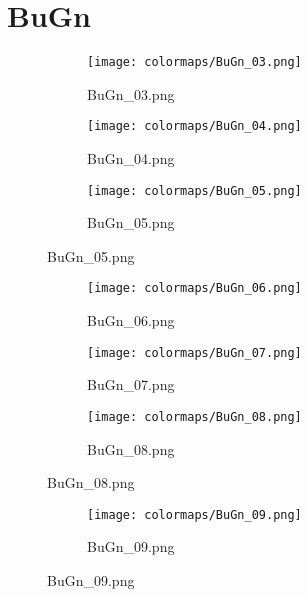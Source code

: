 \documentclass{article}%
\begin{document}
%
\newpage%
\section{BuGn}%
\label{sec:BuGn}%
\hspace{1cm}\hfill%
\hspace{1cm}\hfill%
\hspace{1cm}\hfill%


\begin{figure}[h!]%
\begin{subfigure}[b]{0.3\linewidth}%
\texttt{[image: colormaps/BuGn\_03.png]}%
\caption{BuGn\_03.png}%
\end{subfigure}%
\begin{subfigure}[b]{0.3\linewidth}%
\texttt{[image: colormaps/BuGn\_04.png]}%
\caption{BuGn\_04.png}%
\end{subfigure}%
\begin{subfigure}[b]{0.3\linewidth}%
\texttt{[image: colormaps/BuGn\_05.png]}%
\caption{BuGn\_05.png}%
\end{subfigure}%
\end{figure}

%
\hspace{1cm}\hfill%
\hspace{1cm}\hfill%
\hspace{1cm}\hfill%


\begin{figure}[h!]%
\begin{subfigure}[b]{0.3\linewidth}%
\texttt{[image: colormaps/BuGn\_06.png]}%
\caption{BuGn\_06.png}%
\end{subfigure}%
\begin{subfigure}[b]{0.3\linewidth}%
\texttt{[image: colormaps/BuGn\_07.png]}%
\caption{BuGn\_07.png}%
\end{subfigure}%
\begin{subfigure}[b]{0.3\linewidth}%
\texttt{[image: colormaps/BuGn\_08.png]}%
\caption{BuGn\_08.png}%
\end{subfigure}%
\end{figure}

%
\hspace{1cm}\hfill%


\begin{figure}[h!]%
\begin{subfigure}[b]{0.3\linewidth}%
\texttt{[image: colormaps/BuGn\_09.png]}%
\caption{BuGn\_09.png}%
\end{subfigure}%
\end{figure}
\end{document}
